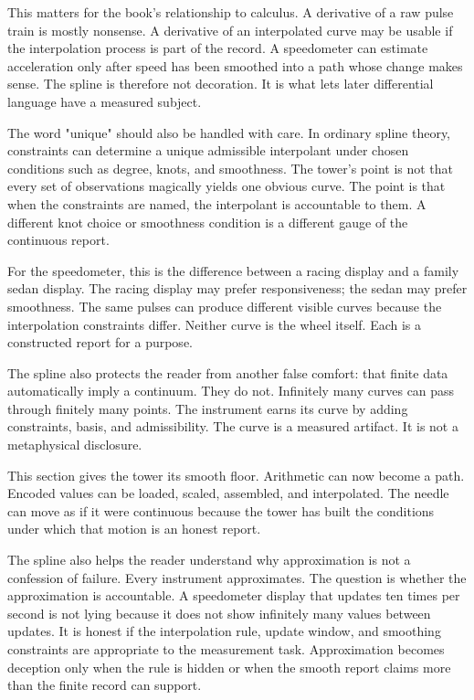 This matters for the book's relationship to calculus. A derivative of a raw
pulse train is mostly nonsense. A derivative of an interpolated curve may be
usable if the interpolation process is part of the record. A speedometer can
estimate acceleration only after speed has been smoothed into a path whose
change makes sense. The spline is therefore not decoration. It is what lets
later differential language have a measured subject.

The word "unique" should also be handled with care. In ordinary spline theory,
constraints can determine a unique admissible interpolant under chosen
conditions such as degree, knots, and smoothness. The tower's point is not that
every set of observations magically yields one obvious curve. The point is that
when the constraints are named, the interpolant is accountable to them. A
different knot choice or smoothness condition is a different gauge of the
continuous report.

For the speedometer, this is the difference between a racing display and a
family sedan display. The racing display may prefer responsiveness; the sedan
may prefer smoothness. The same pulses can produce different visible curves
because the interpolation constraints differ. Neither curve is the wheel
itself. Each is a constructed report for a purpose.

The spline also protects the reader from another false comfort: that finite
data automatically imply a continuum. They do not. Infinitely many curves can
pass through finitely many points. The instrument earns its curve by adding
constraints, basis, and admissibility. The curve is a measured artifact. It is
not a metaphysical disclosure.

This section gives the tower its smooth floor. Arithmetic can now become a
path. Encoded values can be loaded, scaled, assembled, and interpolated. The
needle can move as if it were continuous because the tower has built the
conditions under which that motion is an honest report.

The spline also helps the reader understand why approximation is not a
confession of failure. Every instrument approximates. The question is whether
the approximation is accountable. A speedometer display that updates ten times
per second is not lying because it does not show infinitely many values between
updates. It is honest if the interpolation rule, update window, and smoothing
constraints are appropriate to the measurement task. Approximation becomes
deception only when the rule is hidden or when the smooth report claims more
than the finite record can support.


